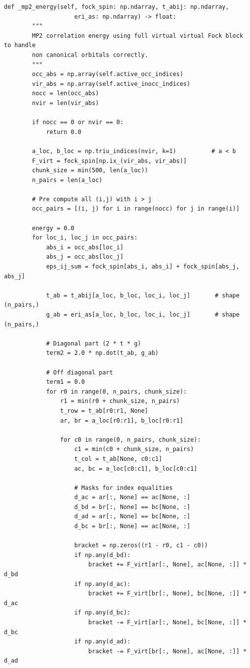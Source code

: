 \begin{lstlisting}[style=python, caption={...}, label=lst:full_code]
    def _mp2_energy(self, fock_spin: np.ndarray, t_abij: np.ndarray,
                    eri_as: np.ndarray) -> float:
        """
        MP2 correlation energy using full virtual virtual Fock block to handle
        non canonical orbitals correctly.
        """
        occ_abs = np.array(self.active_occ_indices)
        vir_abs = np.array(self.active_inocc_indices)
        nocc = len(occ_abs)
        nvir = len(vir_abs)

        if nocc == 0 or nvir == 0:
            return 0.0

        a_loc, b_loc = np.triu_indices(nvir, k=1)          # a < b
        F_virt = fock_spin[np.ix_(vir_abs, vir_abs)]
        chunk_size = min(500, len(a_loc))
        n_pairs = len(a_loc)

        # Pre compute all (i,j) with i > j
        occ_pairs = [(i, j) for i in range(nocc) for j in range(i)]

        energy = 0.0
        for loc_i, loc_j in occ_pairs:
            abs_i = occ_abs[loc_i]
            abs_j = occ_abs[loc_j]
            eps_ij_sum = fock_spin[abs_i, abs_i] + fock_spin[abs_j, abs_j]

            t_ab = t_abij[a_loc, b_loc, loc_i, loc_j]       # shape (n_pairs,)
            g_ab = eri_as[a_loc, b_loc, loc_i, loc_j]       # shape (n_pairs,)

            # Diagonal part (2 * t * g)
            term2 = 2.0 * np.dot(t_ab, g_ab)

            # Off diagonal part
            term1 = 0.0
            for r0 in range(0, n_pairs, chunk_size):
                r1 = min(r0 + chunk_size, n_pairs)
                t_row = t_ab[r0:r1, None]
                ar, br = a_loc[r0:r1], b_loc[r0:r1]

                for c0 in range(0, n_pairs, chunk_size):
                    c1 = min(c0 + chunk_size, n_pairs)
                    t_col = t_ab[None, c0:c1]
                    ac, bc = a_loc[c0:c1], b_loc[c0:c1]

                    # Masks for index equalities
                    d_ac = ar[:, None] == ac[None, :]
                    d_bd = br[:, None] == bc[None, :]
                    d_ad = ar[:, None] == bc[None, :]
                    d_bc = br[:, None] == ac[None, :]

                    bracket = np.zeros((r1 - r0, c1 - c0))
                    if np.any(d_bd):
                        bracket += F_virt[ar[:, None], ac[None, :]] * d_bd
                    if np.any(d_ac):
                        bracket += F_virt[br[:, None], bc[None, :]] * d_ac
                    if np.any(d_bc):
                        bracket -= F_virt[ar[:, None], bc[None, :]] * d_bc
                    if np.any(d_ad):
                        bracket -= F_virt[br[:, None], ac[None, :]] * d_ad


\end{lstlisting}

